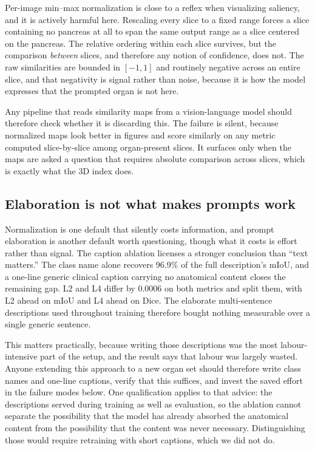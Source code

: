 Per-image min--max normalization is close to a reflex when visualizing saliency,
and it is actively harmful here. Rescaling every slice to a fixed range forces a
slice containing no pancreas at all to span the same output range as a slice
centered on the pancreas. The relative ordering within each slice survives, but
the comparison \emph{between} slices, and therefore any notion of confidence,
does not. The raw similarities are bounded in $[-1,1]$ and routinely negative
across an entire slice, and that negativity is signal rather than noise, because
it is how the model expresses that the prompted organ is not here.

Any pipeline that reads similarity maps from a vision-language model should
therefore check whether it is discarding this. The failure is silent, because
normalized maps look better in figures and score similarly on any metric
computed slice-by-slice among organ-present slices. It surfaces only when the
maps are asked a question that requires absolute comparison across slices, which
is exactly what the 3D index does.

\subsection{Elaboration is not what makes prompts work}

Normalization is one default that silently costs information, and prompt
elaboration is another default worth questioning, though what it costs is effort
rather than signal. The caption ablation licenses a stronger conclusion than
``text matters.'' The class name alone recovers 96.9\% of the full
description's mIoU, and a one-line generic clinical caption carrying no
anatomical content closes the remaining gap. L2 and L4 differ by 0.0006 on both
metrics and split them, with L2 ahead on mIoU and L4 ahead on Dice. The
elaborate multi-sentence descriptions used throughout training therefore bought
nothing measurable over a single generic sentence.

This matters practically, because writing those descriptions was the most
labour-intensive part of the setup, and the result says that labour was largely
wasted. Anyone extending this approach to a new organ set should therefore write
class names and one-line captions, verify that this suffices, and invest the
saved effort in the failure modes below. One qualification applies to that
advice: the descriptions served during training as well as evaluation, so the
ablation cannot separate the possibility that the model has already absorbed the
anatomical content from the possibility that the content was never necessary.
Distinguishing those would require retraining with short captions, which we did
not do.

